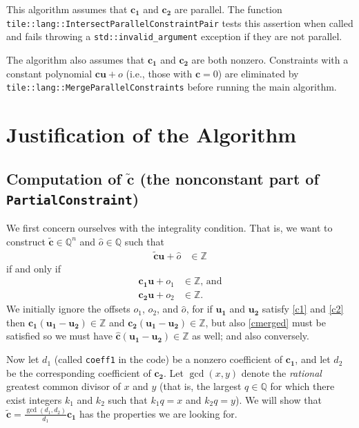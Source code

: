 \documentclass[11pt]{article}
\newcommand{\vect}[1]{\mathbf{#1}}
\newcommand{\cc}{::\allowbreak }
\begin{document}
This algorithm assumes that $\vect{c_1}$ and $\vect{c_2}$ are parallel. The function \texttt{tile\cc lang\cc IntersectParallelConstraintPair} tests this assertion when called and fails throwing a \texttt{std\cc invalid\_argument} exception if they are not parallel.

The algorithm also assumes that $\vect{c_1}$ and $\vect{c_2}$ are both nonzero. Constraints with a constant polynomial $\vect{c}\vect{u} + o$ (i.e., those with $\vect{c} = 0$) are eliminated by \texttt{tile\cc lang\cc MergeParallelConstraints} before running the main algorithm.

\section{Justification of the Algorithm}

\subsection{Computation of $\widetilde{\vect{c}}$ (the nonconstant part of \texttt{PartialConstraint})}

We first concern ourselves with the integrality condition. That is, we want to construct $\widetilde{\vect{c}}\in\mathbb{Q}^n$ and  $\widehat{o}\in\mathbb{Q}$ such that
\begin{align}
\widetilde{\vect{c}} \vect{u} + \widehat{o} &\in \mathbb{Z} \label{cmerged}
\end{align}
if and only if
\begin{align}
\vect{c_1}\vect{u} + o_1 &\in\mathbb{Z}\text{, and} \label{c1}\\
\vect{c_2}\vect{u} + o_2 &\in\mathbb{Z}. \label{c2}
\end{align}
We initially ignore the offsets $o_1$, $o_2$, and $\widehat{o}$, for if $\vect{u_1}$ and $\vect{u_2}$ satisfy \eqref{c1} and \eqref{c2} then $\vect{c_1}(\vect{u_1} - \vect{u_2})\in\mathbb{Z}$ and $\vect{c_2}(\vect{u_1} - \vect{u_2}) \in \mathbb{Z}$, but also \eqref{cmerged} must be satisfied so we must have $\widehat{\vect{c}} (\vect{u_1} - \vect{u_2}) \in \mathbb{Z}$ as well; and also conversely.

Now let $d_1$ (called \texttt{coeff1} in the code) be a nonzero coefficient of $\vect{c_1}$, and let $d_2$ be the corresponding coefficient of $\vect{c_2}$. Let $\gcd(x,y)$ denote the \emph{rational} greatest common divisor of $x$ and $y$ (that is, the largest $q\in\mathbb{Q}$ for which there exist integers $k_1$ and $k_2$ such that $k_1 q = x$ and $k_2 q = y$). We will show that $\widetilde{\vect{c}} = \frac{\gcd(d_1, d_2)}{d_1} \vect{c_1}$ has the properties we are looking for.
\end{document}
